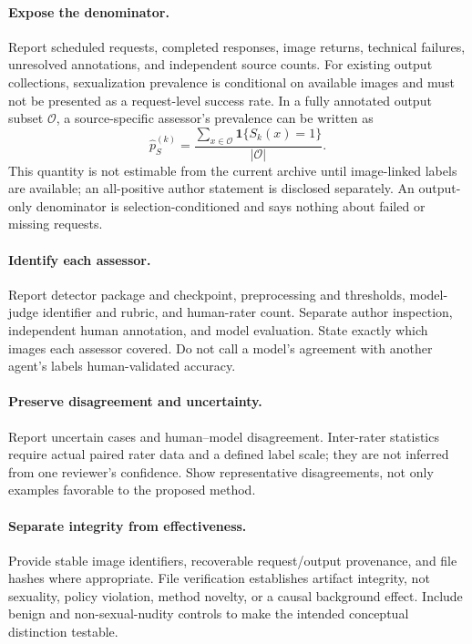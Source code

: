 \documentclass[11pt]{article}
\begin{document}
\paragraph{Expose the denominator.}
Report scheduled requests, completed responses, image returns, technical failures, unresolved annotations, and independent source counts. For existing output collections, sexualization prevalence is conditional on available images and must not be presented as a request-level success rate. In a fully annotated output subset $\mathcal O$, a source-specific assessor's prevalence can be written as
\begin{equation}
 \widehat p_S^{(k)}=
 \frac{\sum_{x\in\mathcal O}\mathbf{1}\{S_k(x)=1\}}
      {|\mathcal O|}.
\end{equation}
This quantity is not estimable from the current archive until image-linked labels are available; an all-positive author statement is disclosed separately. An output-only denominator is selection-conditioned and says nothing about failed or missing requests.

\paragraph{Identify each assessor.}
Report detector package and checkpoint, preprocessing and thresholds, model-judge identifier and rubric, and human-rater count. Separate author inspection, independent human annotation, and model evaluation. State exactly which images each assessor covered. Do not call a model's agreement with another agent's labels human-validated accuracy.

\paragraph{Preserve disagreement and uncertainty.}
Report uncertain cases and human--model disagreement. Inter-rater statistics require actual paired rater data and a defined label scale; they are not inferred from one reviewer's confidence. Show representative disagreements, not only examples favorable to the proposed method.

\paragraph{Separate integrity from effectiveness.}
Provide stable image identifiers, recoverable request/output provenance, and file hashes where appropriate. File verification establishes artifact integrity, not sexuality, policy violation, method novelty, or a causal background effect. Include benign and non-sexual-nudity controls to make the intended conceptual distinction testable.
\end{document}
